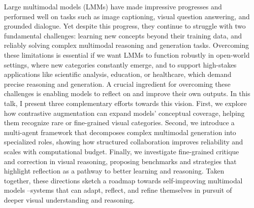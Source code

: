 Large multimodal models (LMMs) have made impressive progresses and performed well on tasks such as image captioning, visual question answering, and grounded dialogue. Yet despite this progress, they continue to struggle with two fundamental challenges: learning new concepts beyond their training data, and reliably solving complex multimodal reasoning and generation tasks. Overcoming these limitations is essential if we want LMMs to function robustly in open-world settings, where new categories constantly emerge, and to support high-stakes applications like scientific analysis, education, or healthcare, which demand precise reasoning and generation. A crucial ingredient for overcoming these challenges is enabling models to reflect on and improve their own outputs. In this talk, I present three complementary efforts towards this vision. First, we explore how contrastive augmentation can expand models’ conceptual coverage, helping them recognize rare or fine-grained visual categories. Second, we introduce a multi-agent framework that decomposes complex multimodal generation into specialized roles, showing how structured collaboration improves reliability and scales with computational budget. Finally, we investigate fine-grained critique and correction in visual reasoning, proposing benchmarks and strategies that highlight reflection as a pathway to better learning and reasoning. Taken together, these directions sketch a roadmap towards self-improving multimodal models --systems that can adapt, reflect, and refine themselves in pursuit of deeper visual understanding and reasoning.
